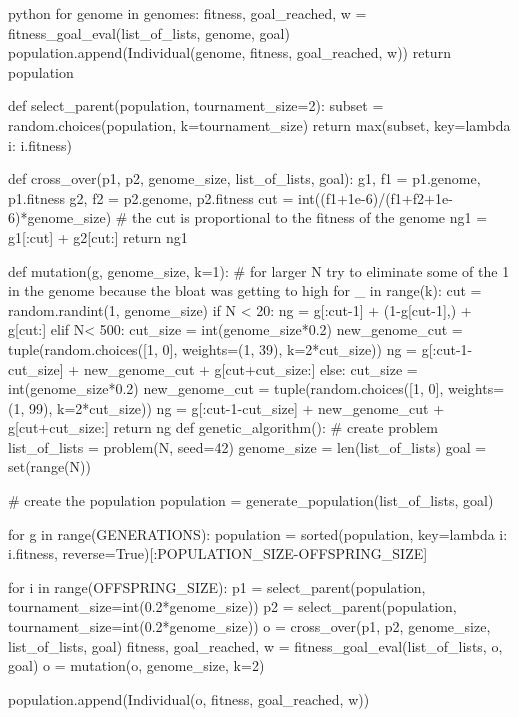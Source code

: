 \begin{mintedbox}{python}
      for genome in genomes:
          fitness, goal_reached, w = fitness_goal_eval(list_of_lists, genome, goal)
          population.append(Individual(genome, fitness, goal_reached, w))
      return population


  def select_parent(population, tournament_size=2):
      subset = random.choices(population, k=tournament_size)
      return max(subset, key=lambda i: i.fitness)


  def cross_over(p1, p2, genome_size, list_of_lists, goal):
      g1, f1 = p1.genome, p1.fitness
      g2, f2 = p2.genome, p2.fitness
      cut = int((f1+1e-6)/(f1+f2+1e-6)*genome_size)   # the cut is proportional to the fitness of the genome
      ng1 = g1[:cut] + g2[cut:]
      return ng1


  def mutation(g, genome_size, k=1):  # for larger N try to eliminate some of the 1 in the genome because the bloat was getting to high
      for _ in range(k):
          cut = random.randint(1, genome_size)
          if N < 20:
              ng = g[:cut-1] + (1-g[cut-1],) + g[cut:]
          elif N< 500:
              cut_size = int(genome_size*0.2)
              new_genome_cut = tuple(random.choices([1, 0], weights=(1, 39), k=2*cut_size))
              ng = g[:cut-1-cut_size] + new_genome_cut + g[cut+cut_size:]
          else:
              cut_size = int(genome_size*0.2)
              new_genome_cut = tuple(random.choices([1, 0], weights=(1, 99), k=2*cut_size))
              ng = g[:cut-1-cut_size] + new_genome_cut + g[cut+cut_size:]
      return ng
  def genetic_algorithm():
      # create problem
      list_of_lists = problem(N, seed=42)
      genome_size = len(list_of_lists)
      goal = set(range(N))

      # create the population
      population = generate_population(list_of_lists, goal)

      for g in range(GENERATIONS):
          population = sorted(population, key=lambda i: i.fitness, reverse=True)[:POPULATION_SIZE-OFFSPRING_SIZE]

          for i in range(OFFSPRING_SIZE):
              p1 = select_parent(population, tournament_size=int(0.2*genome_size))
              p2 = select_parent(population, tournament_size=int(0.2*genome_size))
              o = cross_over(p1, p2, genome_size, list_of_lists, goal)
              fitness, goal_reached, w = fitness_goal_eval(list_of_lists, o, goal)
              o = mutation(o, genome_size, k=2)

              population.append(Individual(o, fitness, goal_reached, w))




\end{mintedbox}

